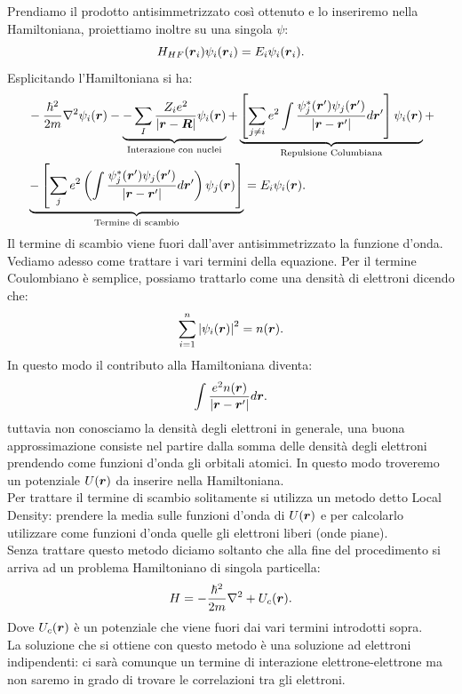 Prendiamo il prodotto antisimmetrizzato così ottenuto e lo inseriremo nella Hamiltoniana, proiettiamo inoltre su una singola $\psi$: 
\[
	H_{HF}(\boldsymbol{r}_i)\psi_i(\boldsymbol{r}_i) 
	=
	E_i \psi_i(\boldsymbol{r}_i)
.\] 
Esplicitando l'Hamiltoniana si ha:
\[\begin{aligned}
	&-\frac{\hbar^2}{2m}\nabla^2\psi_i(\bs{r}) -
%
	\underbrace{-\sum_{I}^{} 
		\frac{Z_i e^2}{\left| \bs{r}-\bs{R} \right| }
		\psi_i (\bs{r})}_
		{\text{Interazione con nuclei}} +
%
	\underbrace{
		\left[ \sum_{j\neq i}^{} 
		e^2\int
		\frac{\psi_j^*(\bs{r}')\psi_j(\bs{r}')}{\left| \bs{r}-\bs{r}' \right| }
		d \bs{r}' \right] \psi_i(\bs{r})}_
		{\text{Repulsione Columbiana}}+\\
%
	&\underbrace{
		-\left[ \sum_{j}^{} e^2\left( \int \frac{\psi_j^*(\bs{r}')
		\psi_j(\bs{r}')}{\left| \bs{r}-\bs{r}'\right|}d\bs{r}'\right)
		\psi_j(\bs{r})\right]}_
		{\text{Termine di scambio}} =
	E_i \psi_i(\bs{r})
.\end{aligned}\]
Il termine di scambio viene fuori dall'aver antisimmetrizzato la funzione d'onda.\\
Vediamo adesso come trattare i vari termini della equazione. Per il termine Coulombiano è semplice, possiamo trattarlo come una densità di elettroni dicendo che:
\[
	\sum_{i=1}^{n} \left| \psi_i(\boldsymbol{r}) \right| ^2=n(\boldsymbol{r})
.\] 
In questo modo il contributo alla Hamiltoniana diventa:
\[
	\int\frac{e^2n(\boldsymbol{r})}{\left| \boldsymbol{r}-\boldsymbol{r}' \right| }d \boldsymbol{r}
.\] 
tuttavia non conosciamo la densità degli elettroni in generale, una buona approssimazione consiste nel partire dalla somma delle densità degli elettroni prendendo come funzioni d'onda gli orbitali atomici. In questo modo troveremo un potenziale $U(\boldsymbol{r})$ da inserire nella Hamiltoniana. \\
Per trattare il termine di scambio solitamente si utilizza un metodo detto Local Density: prendere la media sulle funzioni d'onda di $U(\boldsymbol{r})$ e per calcolarlo utilizzare come funzioni d'onda quelle gli elettroni liberi (onde piane).\\
Senza trattare questo metodo diciamo soltanto che alla fine del procedimento si arriva ad un problema Hamiltoniano di singola particella:
\[
	H = -\frac{\hbar ^2}{2m}\nabla^2 + U_c(\boldsymbol{r})
.\] 
Dove $U_c(\boldsymbol{r})$ è un potenziale che viene fuori dai vari termini introdotti sopra.\\
La soluzione che si ottiene con questo metodo è una soluzione ad elettroni indipendenti: ci sarà comunque un termine di interazione elettrone-elettrone ma non saremo in grado di trovare le correlazioni tra gli elettroni.

